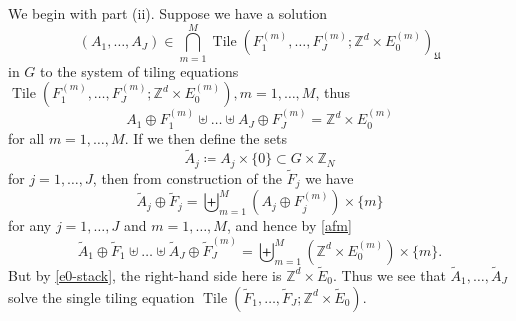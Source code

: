 \documentclass[reqno,a4paper,12pt]{amsart}
\numberwithin{equation}{section}
\numberwithin{figure}{section}
\def\Z{\mathbb{Z}}
\newcommand{\Tile}{\operatorname{Tile}}
\newcommand{\Universe}{{\mathfrak{U}}}
\theoremstyle{plain}
\theoremstyle{definition}
\begin{document}
We begin with part (ii).  Suppose we have a solution 
$$(A_1,\dots,A_J) \in \bigcap_{m=1}^M \Tile(F_1^{(m)},\dots,F_J^{(m)}; \Z^d \times E_0^{(m)})_\Universe$$
in $G$ to the system of tiling equations $\Tile(F_1^{(m)},\dots,F_J^{(m)}; \Z^d \times E_0^{(m)}), m=1,\dots,M$, thus
\begin{equation}\label{afm}
A_1 \oplus F_1^{(m)} \uplus \dots \uplus A_J \oplus F_J^{(m)} = \Z^d \times E_0^{(m)}
\end{equation}
for all $m=1,\dots,M$.  If we then define the sets
$$ \tilde A_j \coloneqq A_j \times \{0\} \subset G \times \Z_N$$
for $j=1,\dots,J$, then from construction of the $\tilde F_j$ we have
$$ \tilde A_j \oplus \tilde F_j = \biguplus_{m=1}^M (A_j \oplus F_j^{(m)}) \times \{m\}$$
for any $j=1,\dots,J$ and $m=1,\dots,M$, and hence by \eqref{afm}
$$ \tilde A_1 \oplus \tilde F_1 \uplus \dots \uplus \tilde A_J \oplus \tilde F_J^{(m)} = \biguplus_{m=1}^M (\Z^d \times E_0^{(m)}) \times \{m\}.$$
But by \eqref{e0-stack}, the right-hand side here is $\Z^d \times \tilde E_0$.  Thus we see that $\tilde A_1,\dots,\tilde A_J$ solve the single tiling equation 
$\Tile(\tilde F_1,\dots,\tilde F_J; \Z^d \times \tilde E_0)$.
\end{document}
